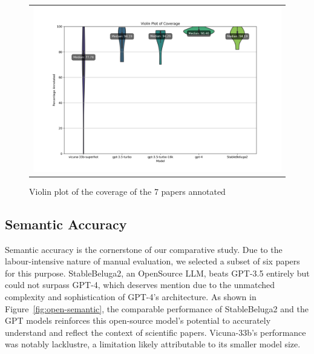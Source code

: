 \begin{figure}[htpb]
  \centering
  \begin{tabular}{c}
  \includegraphics[width=14cm]{images/open-coverage.png}
  \end{tabular}
  \caption[Open Source Coverage]{Violin plot of the coverage of the 7 papers annotated}\label{fig:open-coverage}
\end{figure}

\subsection{Semantic Accuracy}

Semantic accuracy is the cornerstone of our comparative study. Due to the labour-intensive nature of manual evaluation, we selected a subset of six papers for this purpose. StableBeluga2, an OpenSource LLM, beats GPT-3.5 entirely but could not surpass GPT-4, which deserves mention due to the unmatched complexity and sophistication of GPT-4's architecture. As shown in Figure~\ref{fig:open-semantic}, the comparable performance of StableBeluga2 and the GPT models reinforces this open-source model's potential to accurately understand and reflect the context of scientific papers. Vicuna-33b's performance was notably lacklustre, a limitation likely attributable to its smaller model size.

